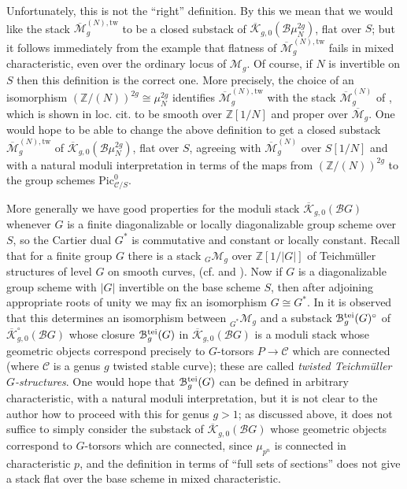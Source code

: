 \documentclass[11pt]{amsart}
\theoremstyle{definition}
\begin{document}
\begin{appendix}
Unfortunately, this is not the ``right'' definition. By this we mean that we would like the stack $\overline{\mathcal{M}}^{(N),\mathrm{tw}}_g$ to be a closed substack of $\overline{\mathcal{K}}_{g,0}({\mathcal{B}} \mu_N^{2g})$, flat over $S$; but it follows immediately from the example \cite[appendix]{CN} that flatness of $\overline{\mathcal{M}}^{(N),\mathrm{tw}}_g$ fails in mixed characteristic, even over the ordinary locus of ${\mathcal{M}}_g$. Of course, if $N$ is invertible on $S$ then this definition is the correct one. More precisely, the choice of an isomorphism $(\mathbb{Z}/(N))^{2g} \cong \mu_N^{2g}$ identifies $\overline{\mathcal{M}}^{(N),\mathrm{tw}}_g$ with the stack $\overline{\mathcal{M}}^{(N)}_g$ of \cite[\S6]{ACV}, which is shown in loc. cit. to be smooth over $\mathbb{Z}[1/N]$ and proper over $\overline{\mathcal{M}}_g$.  One would hope to be able to change the above definition to get a closed substack $\overline{\mathcal{M}}^{(N),\mathrm{tw}}_g$ of $\overline{\mathcal{K}}_{g,0}({\mathcal{B}} \mu_N^{2g})$, flat over $S$, agreeing with $\overline{\mathcal{M}}^{(N)}_g$ over $S[1/N]$ and with a natural moduli interpretation in terms of the maps from $(\mathbb{Z}/(N))^{2g}$ to the group schemes $\mathrm{Pic}^0_{{\mathcal{C}}/S}$. 

More generally we have good properties for the moduli stack $\overline{\mathcal{K}}_{g,0}({\mathcal{B}} G)$ whenever $G$ is a finite diagonalizable or locally diagonalizable group scheme over $S$, so the Cartier dual $G^*$ is commutative and constant or locally constant. Recall that for a finite group $G$ there is a stack $_G{\mathcal{M}}_g$ over $\mathbb{Z}[1/|G|]$ of Teichm\"uller structures of level $G$ on smooth curves, (cf. \cite[5.6]{DM} and \cite{PJ}). Now if $G$ is a diagonalizable group scheme with $|G|$ invertible on the base scheme $S$, then after adjoining appropriate roots of unity we may fix an isomorphism $G \cong G^*$. In \cite[5.2.3]{ACV} it is observed that this determines an isomorphism between $_{G^*}{\mathcal{M}}_g$ and a substack ${\mathbf{\EuScript{B}}}^{\mathrm{tei}}_g(G)^\circ$ of $\overline{\mathcal{K}}^\circ_{g,0}({\mathcal{B}} G)$ whose closure ${\mathbf{\EuScript{B}}}^{\mathrm{tei}}_g(G)$ in $\overline{\mathcal{K}}_{g,0}({\mathcal{B}} G)$ is a moduli stack whose geometric objects correspond precisely to $G$-torsors $P \rightarrow {\mathcal{C}}$ which are connected (where ${\mathcal{C}}$ is a genus $g$ twisted stable curve); these are called \textit{twisted Teichm\"uller $G$-structures}. One would hope that ${\mathbf{\EuScript{B}}}^{\mathrm{tei}}_g(G)$ can be defined in arbitrary characteristic, with a natural moduli interpretation, but it is not clear to the author how to proceed with this for genus $g>1$; as discussed above, it does not suffice to simply consider the substack of $\overline{\mathcal{K}}_{g,0}({\mathcal{B}} G)$ whose geometric objects correspond to $G$-torsors which are connected, since $\mu_{p^n}$ is connected in characteristic $p$, and the definition in terms of ``full sets of sections'' does not give a stack flat over the base scheme in mixed characteristic.

\end{appendix}
\end{document}
